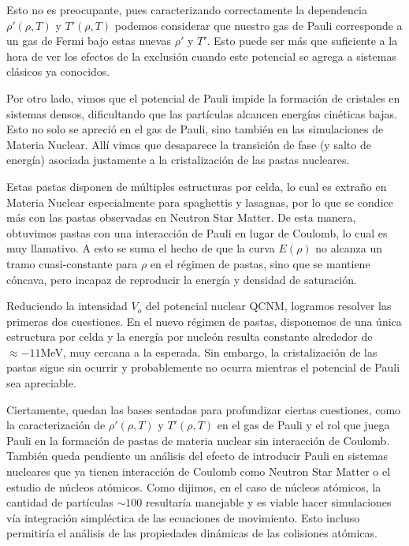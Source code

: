 Esto no es preocupante, pues caracterizando correctamente la dependencia $\rho'(\rho, T)$ y $T'(\rho, T)$ podemos considerar que nuestro gas de Pauli corresponde a un gas de Fermi bajo estas 
nuevas $\rho'$ y $T'$.
Esto puede ser más que suficiente a la hora de ver los efectos de la exclusión cuando este potencial se agrega a sistemas clásicos ya conocidos.

Por otro lado, vimos que el potencial de Pauli impide la formación de cristales en sistemas densos, dificultando que las partículas alcancen energías cinéticas bajas.
Esto no solo se apreció en el gas de Pauli, sino también en las simulaciones de Materia Nuclear.
Allí vimos que desaparece la transición de fase (y salto de energía) asociada justamente a la cristalización de las pastas nucleares.

Estas pastas disponen de múltiples estructuras por celda, lo cual es extraño en Materia Nuclear especialmente para spaghettis y lasagnas, por lo que se condice más con las pastas observadas en Neutron Star Matter.
De esta manera, obtuvimos pastas con una interacción de Pauli en lugar de Coulomb, lo cual es muy llamativo.
A esto se suma el hecho de que la curva $E(\rho)$ no alcanza un tramo cuasi-constante para $\rho$ en el régimen de pastas, sino que se mantiene cóncava, pero incapaz de reproducir la energía y densidad de saturación.

Reduciendo la intensidad $V_o$ del potencial nuclear QCNM, logramos resolver las primeras dos cuestiones.
En el nuevo régimen de pastas, disponemos de una única estructura por celda y la energía por nucleón resulta constante alrededor de $\approx -11$MeV, muy cercana a la esperada.
Sin embargo, la cristalización de las pastas sigue sin ocurrir y probablemente no ocurra mientras el potencial de Pauli sea apreciable.

Ciertamente, quedan las bases sentadas para profundizar ciertas cuestiones, como la caracterización de $\rho'(\rho, T)$ y $T'(\rho, T)$ en el gas de Pauli y el rol que juega Pauli en la formación de pastas 
de materia nuclear sin interacción de Coulomb. 
También queda pendiente un análisis del efecto de introducir Pauli en sistemas nucleares que ya tienen interacción de Coulomb como Neutron Star Matter o el estudio de núcleos atómicos. 
Como dijimos, en el caso de núcleos atómicos, la cantidad de partículas $\sim 100$ resultaría manejable y es viable hacer simulaciones vía integración simpléctica de las ecuaciones de movimiento.
Esto incluso permitiría el análisis de las propiedades dinámicas de las colisiones atómicas.